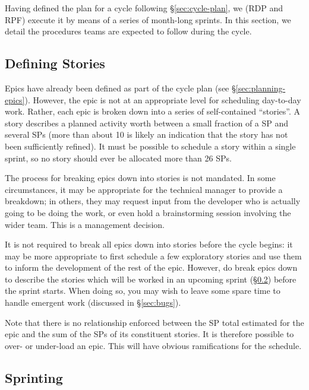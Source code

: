 Having defined the plan for a \gls{cycle} following \S\ref{sec:cycle-plan}, we (RDP and RPF) execute it by means of a series of month-long sprints.
In this section, we detail the procedures teams are expected to follow during the \gls{cycle}.

\subsection{Defining Stories}
\label{sec:defining-stories}

Epics have already been defined as part of the \gls{cycle} plan (see \S\ref{sec:planning-epics}).
However, the \gls{epic} is not at an appropriate level for scheduling day-to-day work.
Rather, each \gls{epic} is broken down into a series of self-contained ``stories''.
A \gls{story} describes a planned activity worth between a small fraction of a SP and several \glspl{SP} (more than about 10 is likely an indication that the \gls{story} has not been sufficiently refined).
It must be possible to schedule a \gls{story} within a single sprint, so no \gls{story} should ever be allocated more than 26 \glspl{SP}.

The process for breaking \glspl{epic} down into stories is not mandated. In
some circumstances, it may be appropriate for the technical manager to
provide a breakdown; in others, they may request input from the
developer who is actually going to be doing the work, or even hold a
brainstorming session involving the wider team. This is a management
decision.

It is not required to break all \glspl{epic} down into stories before the \gls{cycle} begins: it may be more appropriate to first schedule a few exploratory stories and use them to inform the development of the rest of the \gls{epic}.
However, do break \glspl{epic} down to describe the stories which will be worked in an upcoming sprint (\S\ref{sec:sprinting}) before the sprint starts.
When doing so, you may wish to leave some spare time to handle emergent work (discussed in \S\ref{sec:bugs}).

Note that there is no relationship enforced between the \gls{SP} total estimated for the \gls{epic} and the sum of the \glspl{SP} of its constituent stories.
It is therefore possible to over- or under-load an \gls{epic}.
This will have obvious ramifications for the schedule.

\subsection{Sprinting}
\label{sec:sprinting}

